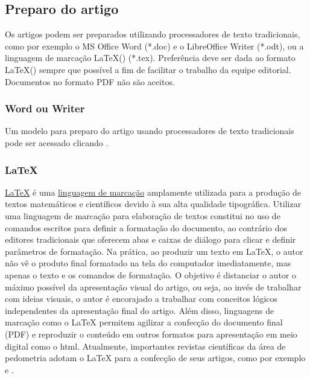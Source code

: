 \vspace{0.5cm}
\vspace{0.5cm}


\subsection{Preparo do artigo}

Os artigos podem ser preparados utilizando processadores de texto tradicionais, como por exemplo o MS Office Word (*.doc) e o LibreOffice Writer (*.odt), ou a linguagem de marcação \LaTeX() (*.tex). Preferência deve ser dada ao formato \LaTeX() sempre que possível a fim de facilitar o trabalho da equipe editorial. Documentos no formato PDF não são aceitos.

\subsubsection{Word ou Writer}

Um modelo para preparo do artigo usando processadores de texto tradicionais pode ser acessado clicando \aquiWord.

\subsubsection{\LaTeX}

\href{http://pt.wikipedia.org/wiki/Latex}{\LaTeX} é uma \href{http://pt.wikipedia.org/wiki/Linguagem_de_marca\%C3\%A7\%C3\%A3o}{linguagem de marcação} amplamente utilizada para a produção de textos matemáticos e científicos devido à sua alta qualidade tipográfica. Utilizar uma linguagem de marcação para elaboração de textos constitui no uso de comandos escritos para definir a formatação do documento, ao contrário dos editores tradicionais que oferecem abas e caixas de diálogo para clicar e definir parâmetros de formatação. Na prática, ao produzir um texto em \LaTeX, o autor não vê o produto final formatado na tela do computador imediatamente, mas apenas o texto e os comandos de formatação. O objetivo é distanciar o autor o máximo possível da apresentação visual do artigo, ou seja, ao invés de trabalhar com ideias visuais, o autor é encorajado a trabalhar com conceitos lógicos independentes da apresentação final do artigo. Além disso, linguagens de marcação como o \LaTeX{} permitem agilizar a confecção do documento final (PDF) e reproduzir o conteúdo em outros formatos para apresentação em meio digital como o html. Atualmente, importantes revistas científicas da área de pedometria adotam o \LaTeX{} para a confecção de seus artigos, como por exemplo \Geoderma{} e \EJSS.

